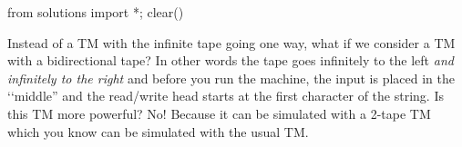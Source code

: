 \begin{python0}
from solutions import *; clear()
\end{python0}

Instead of a TM with the infinite tape going one way, what if we
consider a TM with a bidirectional tape? In other words the tape
goes infinitely to the left \textit{and infinitely to the right}
and before you run the
machine, the input is placed in the \lq\lq middle'' and the read/write head
starts at the first character of the string. Is this TM more
powerful? No! Because it can be simulated with a 2-tape TM which you know
can be simulated with the usual TM.

